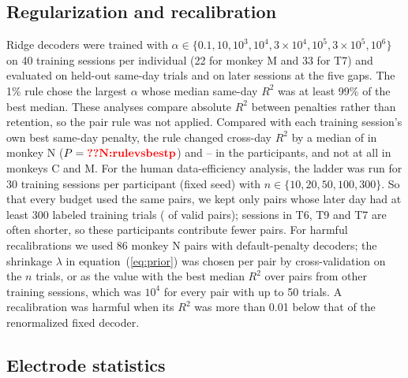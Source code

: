 \documentclass[pdflatex,sn-nature]{sn-jnl}
\begin{document}
\subsection*{Regularization and recalibration}

Ridge decoders were trained with $\alpha \in \{0.1, 10, 10^3, 10^4, 3\times10^4, 10^5, 3\times10^5, 10^6\}$ on 40
training sessions per individual (22 for monkey M and 33 for T7) and evaluated on held-out same-day trials and on later sessions at
the five gaps. The 1\% rule chose the largest $\alpha$ whose median same-day $R^2$ was at least 99\% of the best median. These
analyses compare absolute $R^2$ between penalties rather than retention, so the pair rule was not applied.
Compared with each training session's own best same-day penalty, the rule changed cross-day $R^2$ by a median of
 in monkey N ($P = \val{N:rulevsbestp}$) and -- in the
participants, and not at all in monkeys C and M.
For the human data-efficiency analysis, the ladder was run for 30 training sessions per participant (fixed seed) with
$n \in \{10, 20, 50, 100, 300\}$. So that every budget used the same pairs, we kept only pairs whose later day had at
least 300 labeled training trials ( of  valid pairs); sessions in T6, T9 and T7 are
often shorter, so these participants contribute fewer pairs. For harmful recalibrations we used 86 monkey N pairs with default-penalty decoders; the
shrinkage $\lambda$ in equation~(\ref{eq:prior}) was chosen per pair by cross-validation on the $n$ trials, or as the value
with the best median $R^2$ over pairs from other training sessions, which was $10^4$ for every pair with up to 50
trials. A recalibration was harmful when its $R^2$ was more than 0.01 below that of the renormalized fixed decoder.

\subsection*{Electrode statistics}
\end{document}
